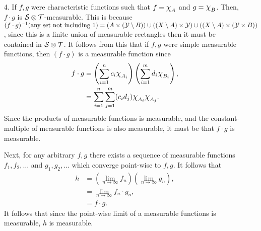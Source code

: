 \documentclass{article}
\theoremstyle{remark}
\begin{document}
\begin{enumerate}[leftmargin=*]
   
   \item[4.] If $f,g$ were characteristic functions such that $f = \mbox{\large$\chi$}_{A}$ and $g = \mbox{\large$\chi$}_{B}$. Then, $f \cdot g$ is $\mathcal{S} \otimes \mathcal{T}$-measurable. This is because $(f \cdot g)^{-1}(\text{any set not including 1}) = (A \times (\mathcal{Y} \setminus B)) \cup ((X\setminus A) \times \mathcal{Y}) \cup ((X\setminus A)\times (\mathcal{Y} \times B))$, since this is a finite union of measurable rectangles then it must be contained in $\mathcal{S} \otimes \mathcal{T}$. It follows from this that if $f,g$ were simple measurable functions, then $(f\cdot g)$ is a measurable function since 
   \begin{align*}
        f\cdot g &= \left(\sum_{i=1}^n c_i\mbox{\large$\chi$}_{A_i}\right)\left(\sum_{i=1}^m d_i\mbox{\large$\chi$}_{B_i}\right), \\
        &= \sum_{i=1}^n \sum_{j=1}^m (c_id_j)\mbox{\large$\chi$}_{A_i}\mbox{\large$\chi$}_{A_j}.
   \end{align*}
   Since the products of measurable functions is measurable, and the constant-multiple of measurable functions is also measurable, it must be that $f\cdot g$ is measurable. 

   Next, for any arbitrary $f,g$ there exists a sequence of measurable functions $f_1,f_2,\ldots$ and $g_1,g_2,\ldots$ which converge point-wise to $f,g$. It follows that 
   \begin{align*}
       h &= \left(\lim_{n\to\infty} f_n\right)\left(\lim_{n\to\infty} g_n \right), \\
       &= \lim_{n\to\infty} f_n \cdot g_n, \\
       &= f \cdot g.
   \end{align*}
   It follows that since the point-wise limit of a measurable functions is measurable, $h$ is measurable.



\end{enumerate}
\end{document}
